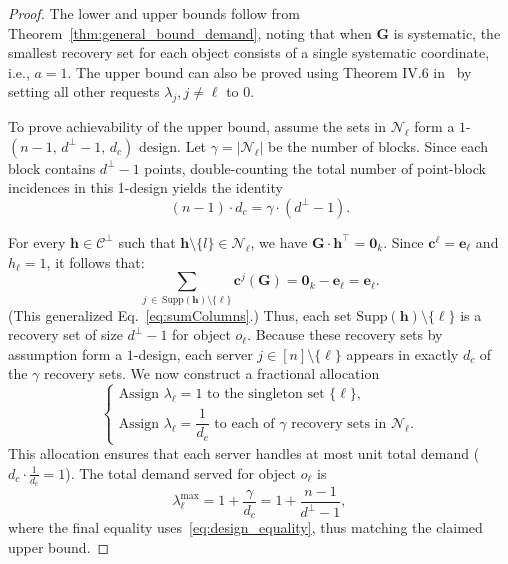\documentclass[conference,letterpaper]{IEEEtran}
\begin{document}
\begin{proof}
The lower and upper bounds follow from Theorem~\ref{thm:general_bound_demand}, noting that when $\boldsymbol{G}$ is systematic, the smallest recovery set for each object consists of a single systematic coordinate, i.e., \( a = 1 \). The upper bound can also be proved using Theorem IV.6 in~\cite{DualCode:GianiraAS22} by setting all other requests $\lambda_{j}, j \neq \ell$ to 0.

To prove achievability of the upper bound, assume the sets in \( \mathcal{N}_{\ell} \) form a \( 1 \)-\((n-1,\, d^\perp - 1,\, d_c)\) design. Let \( \gamma = |\mathcal{N}_{\ell}| \) be the number of blocks. Since each block contains \( d^\perp - 1 \) points, double-counting the total number of point-block incidences in this 1-design yields the identity
\begin{equation}\label{eq:design_equality}
(n - 1) \cdot d_c = \gamma \cdot (d^\perp - 1).
\end{equation}

For every \( \boldsymbol{h} \in \mathcal{C}^\perp \) such that $\boldsymbol{h}\setminus\{l\} \in  \mathcal{N}_{\ell}$, we have 
\( \boldsymbol{G} \cdot \boldsymbol{h}^\top = \boldsymbol{0}_k \). Since \( \boldsymbol{c}^{\ell} = \boldsymbol{e}_{\ell} \) and \( h_{\ell} = 1 \), it follows that:
\[
\sum_{j\, \in\, \mathrm{Supp}(\boldsymbol{h}) \setminus \{\ell\}} \boldsymbol{c}^j(\boldsymbol{G}) = \boldsymbol{0}_k - \boldsymbol{e}_{\ell} = \boldsymbol{e}_{\ell}.
\]
(This generalized Eq.~\eqref{eq:sumColumns}.) Thus, each set \( \mathrm{Supp}(\boldsymbol{h}) \setminus \{\ell\} \) is a recovery set of size $d^{\perp}-1$ for object \( o_{\ell} \). Because these recovery sets by assumption form a \( 1 \)-design, each server \( j \in [n] \setminus \{\ell\} \) appears in exactly \( d_c \) of the \( \gamma \) recovery sets. We now construct a fractional allocation
\[
\begin{cases}
\text{Assign } \lambda_{\ell} = 1 \text{ to the singleton set } \{\ell\}, \\
\text{Assign } \lambda_{\ell} = \dfrac{1}{d_c} \text{ to each of $\gamma$ recovery sets in } \mathcal{N}_{\ell}.
\end{cases}
\]
This allocation ensures that each server handles at most unit total demand ($d_c \cdot \frac{1}{d_c} = 1$). The total demand served for object \( o_{\ell} \) is
\[
\lambda_{\ell}^{\max} = 1 + \frac{\gamma}{d_c} = 1 + \frac{n - 1}{d^\perp - 1},
\]
where the final equality uses~\eqref{eq:design_equality}, thus matching the claimed upper bound.
\end{proof}
\end{document}
